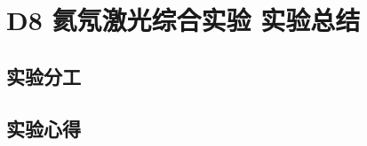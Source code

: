 \documentclass[dvipsnames, svgnames,a4paper,11pt]{article}
\begin{document}
		

	


	







	






	
		

\clearpage
\section{D8 \quad 氦氖激光综合实验 \quad\heiti 实验总结}

	\subsection{实验分工}

		

	\subsection{实验心得}

	
\end{document}
